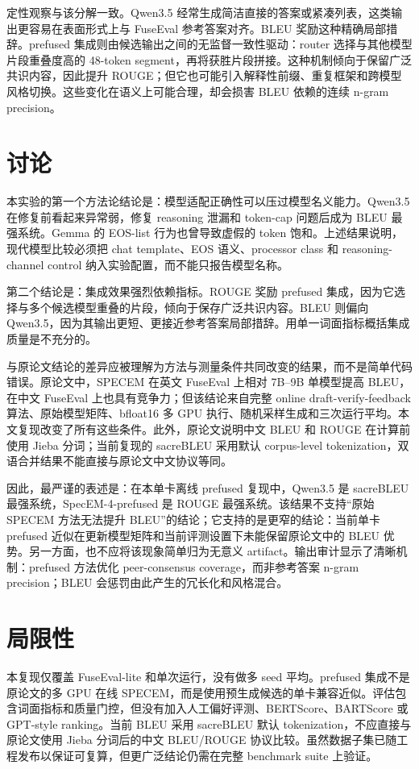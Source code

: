 \documentclass[11pt]{ctexart}
\begin{document}
定性观察与该分解一致。Qwen3.5 经常生成简洁直接的答案或紧凑列表，这类输出更容易在表面形式上与 FuseEval 参考答案对齐。BLEU 奖励这种精确局部措辞。prefused 集成则由候选输出之间的无监督一致性驱动：router 选择与其他模型片段重叠度高的 48-token segment，再将获胜片段拼接。这种机制倾向于保留广泛共识内容，因此提升 ROUGE；但它也可能引入解释性前缀、重复框架和跨模型风格切换。这些变化在语义上可能合理，却会损害 BLEU 依赖的连续 n-gram precision。

\section{讨论}
本实验的第一个方法论结论是：模型适配正确性可以压过模型名义能力。Qwen3.5 在修复前看起来异常弱，修复 reasoning 泄漏和 token-cap 问题后成为 BLEU 最强系统。Gemma 的 EOS-list 行为也曾导致虚假的 token 饱和。上述结果说明，现代模型比较必须把 chat template、EOS 语义、processor class 和 reasoning-channel control 纳入实验配置，而不能只报告模型名称。

第二个结论是：集成效果强烈依赖指标。ROUGE 奖励 prefused 集成，因为它选择与多个候选模型重叠的片段，倾向于保存广泛共识内容。BLEU 则偏向 Qwen3.5，因为其输出更短、更接近参考答案局部措辞。用单一词面指标概括集成质量是不充分的。

与原论文结论的差异应被理解为方法与测量条件共同改变的结果，而不是简单代码错误。原论文中，SPECEM 在英文 FuseEval 上相对 7B--9B 单模型提高 BLEU，在中文 FuseEval 上也具有竞争力；但该结论来自完整 online draft-verify-feedback 算法、原始模型矩阵、bfloat16 多 GPU 执行、随机采样生成和三次运行平均。本文复现改变了所有这些条件。此外，原论文说明中文 BLEU 和 ROUGE 在计算前使用 Jieba 分词；当前复现的 sacreBLEU 采用默认 corpus-level tokenization，双语合并结果不能直接与原论文中文协议等同。

因此，最严谨的表述是：在本单卡离线 prefused 复现中，Qwen3.5 是 sacreBLEU 最强系统，SpecEM-4-prefused 是 ROUGE 最强系统。该结果不支持“原始 SPECEM 方法无法提升 BLEU”的结论；它支持的是更窄的结论：当前单卡 prefused 近似在更新模型矩阵和当前评测设置下未能保留原论文中的 BLEU 优势。另一方面，也不应将该现象简单归为无意义 artifact。输出审计显示了清晰机制：prefused 方法优化 peer-consensus coverage，而非参考答案 n-gram precision；BLEU 会惩罚由此产生的冗长化和风格混合。

\section{局限性}
本复现仅覆盖 FuseEval-lite 和单次运行，没有做多 seed 平均。prefused 集成不是原论文的多 GPU 在线 SPECEM，而是使用预生成候选的单卡兼容近似。评估包含词面指标和质量门控，但没有加入人工偏好评测、BERTScore、BARTScore 或 GPT-style ranking。当前 BLEU 采用 sacreBLEU 默认 tokenization，不应直接与原论文使用 Jieba 分词后的中文 BLEU/ROUGE 协议比较。虽然数据子集已随工程发布以保证可复算，但更广泛结论仍需在完整 benchmark suite 上验证。
\end{document}
